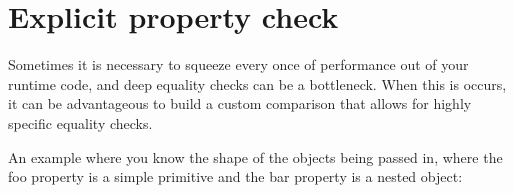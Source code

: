 \chapter{Explicit property check}
\hypertarget{md_node__modules_2fast-equals_2recipes_2explicit-property-check}{}\label{md_node__modules_2fast-equals_2recipes_2explicit-property-check}
\label{md_node__modules_2fast-equals_2recipes_2explicit-property-check_autotoc_md15079}%
%


Sometimes it is necessary to squeeze every once of performance out of your runtime code, and deep equality checks can be a bottleneck. When this is occurs, it can be advantageous to build a custom comparison that allows for highly specific equality checks.

An example where you know the shape of the objects being passed in, where the {\ttfamily foo} property is a simple primitive and the {\ttfamily bar} property is a nested object\+:


\begin{DoxyCode}{0}
\DoxyCodeLine{}
\DoxyCodeLine{\ \ \};}
\DoxyCodeLine{\}}
\DoxyCodeLine{}
\DoxyCodeLine{}
\DoxyCodeLine{\});}

\end{DoxyCode}
 